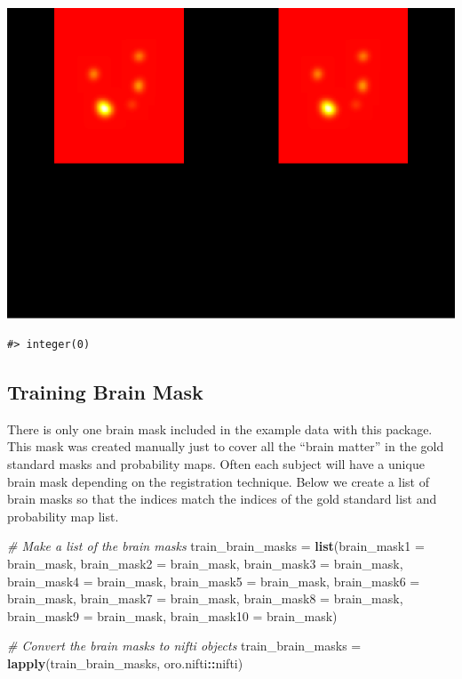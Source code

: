 \documentclass[]{article}
\newenvironment{Shaded}{\begin{snugshade}}{\end{snugshade}}
\newcommand{\CommentTok}[1]{\textcolor[rgb]{0.56,0.35,0.01}{\textit{#1}}}
\newcommand{\DataTypeTok}[1]{\textcolor[rgb]{0.13,0.29,0.53}{#1}}
\newcommand{\KeywordTok}[1]{\textcolor[rgb]{0.13,0.29,0.53}{\textbf{#1}}}
\newcommand{\NormalTok}[1]{#1}
\newcommand{\OperatorTok}[1]{\textcolor[rgb]{0.81,0.36,0.00}{\textbf{#1}}}
\newcommand{\StringTok}[1]{\textcolor[rgb]{0.31,0.60,0.02}{#1}}
\begin{document}
\includegraphics{tapas-vignette_files/figure-latex/unnamed-chunk-11-10.pdf}

\begin{verbatim}
#> integer(0)
\end{verbatim}

\hypertarget{training-brain-mask}{%
\subsection{Training Brain Mask}\label{training-brain-mask}}

There is only one brain mask included in the example data with this
package. This mask was created manually just to cover all the ``brain
matter'' in the gold standard masks and probability maps. Often each
subject will have a unique brain mask depending on the registration
technique. Below we create a list of brain masks so that the indices
match the indices of the gold standard list and probability map list.

\begin{Shaded}
\begin{Highlighting}[]
\CommentTok{# Make a list of the brain masks}
\NormalTok{train_brain_masks =}\StringTok{ }\KeywordTok{list}\NormalTok{(}\DataTypeTok{brain_mask1 =}\NormalTok{ brain_mask, }
                         \DataTypeTok{brain_mask2 =}\NormalTok{ brain_mask, }
                         \DataTypeTok{brain_mask3 =}\NormalTok{ brain_mask, }
                         \DataTypeTok{brain_mask4 =}\NormalTok{ brain_mask, }
                         \DataTypeTok{brain_mask5 =}\NormalTok{ brain_mask, }
                         \DataTypeTok{brain_mask6 =}\NormalTok{ brain_mask, }
                         \DataTypeTok{brain_mask7 =}\NormalTok{ brain_mask, }
                         \DataTypeTok{brain_mask8 =}\NormalTok{ brain_mask, }
                         \DataTypeTok{brain_mask9 =}\NormalTok{ brain_mask, }
                         \DataTypeTok{brain_mask10 =}\NormalTok{ brain_mask)}

\CommentTok{# Convert the brain masks to nifti objects}
\NormalTok{train_brain_masks =}\StringTok{ }\KeywordTok{lapply}\NormalTok{(train_brain_masks, oro.nifti}\OperatorTok{::}\NormalTok{nifti)}
\end{Highlighting}
\end{Shaded}
\end{document}
